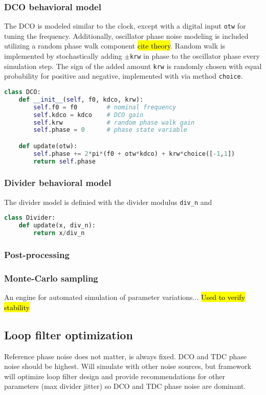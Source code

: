 \subsubsection{DCO behavioral model}
The DCO is modeled similar to the clock, except with a digital input \texttt{otw} for tuning the frequency. Additionally, oscillator phase noise modeling is included utilizing a random phase walk component \hl{cite theory}. Random walk is implemented by stochastically adding $\pm$\texttt{krw} in phase to the oscillator phase every
simulation step. The sign of the added amount \texttt{krw} is randomly chosen with equal probability for positive and negative, implemented with via method \texttt{choice}. 
\begin{lstlisting}[language={Python}, caption={DCO behavioral model.}, label={dco_code}]
class DCO:
	def __init__(self, f0, kdco, krw):
		self.f0 = f0		# nominal frequency
		self.kdco = kdco 	# DCO gain
		self.krw			# random phase walk gain
		self.phase = 0		# phase state variable

	def update(otw):
		self.phase += 2*pi*(f0 + otw*kdco) + krw*choice([-1,1])
		return self.phase
    \end{lstlisting}

\subsubsection{Divider behavioral model}
The divider model is definied with the divider modulus \texttt{div\_n} and
\begin{lstlisting}[language={Python}, caption={Divider behavioral model.}, label={div_code}]
class Divider:
	def update(x, div_n):
		return x/div_n
\end{lstlisting}
\subsubsection{Post-processing}

\subsubsection{Monte-Carlo sampling}
An engine for automated simulation of parameter variations...
	\hl{Used to verify stability}

\subsection{Loop filter optimization}
	Reference phase noise does not matter, is always fixed.
	DCO and TDC phase noise should be highest. Will simulate with other noise sources, but framework will optimize loop filter design and provide recommendations for other parameters (max divider jitter) so DCO and TDC phase noise are dominant.
